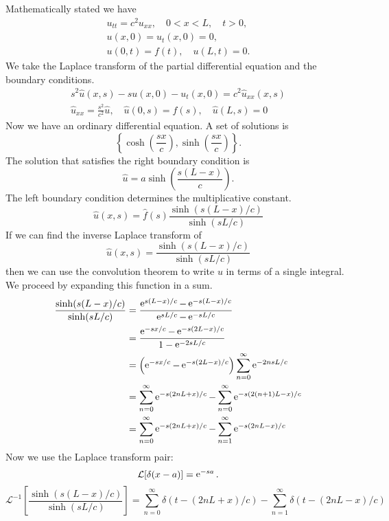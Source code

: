 {%
\begin{Solution}
  Mathematically stated we have
  \begin{gather*}
    u_{t t} = c^2 u_{x x}, \quad 0 < x < L, \quad t > 0, \\
    u(x,0) = u_t(x,0) = 0, \\
    u(0,t) = f(t), \quad u(L,t) = 0.
  \end{gather*}
  We take the Laplace transform of the partial differential equation and the
  boundary conditions.
  \begin{gather*}
    s^2 \hat{u}(x,s) - s u(x,0) - u_t(x,0) = c^2 \hat{u}_{x x}(x,s) \\
    \hat{u}_{x x} = \frac{s^2}{c^2} \hat{u}, \quad \hat{u}(0,s) = \hat{f}(s),
    \quad \hat{u}(L,s) = 0
  \end{gather*}
  Now we have an ordinary differential equation.  A set of solutions is
  \[
  \left\{ \cosh \left( \frac{s x}{c} \right), \sinh \left( \frac{s x}{c} \right)
  \right\}.
  \]
  The solution that satisfies the right boundary condition is
  \[
  \hat{u} = a \sinh \left( \frac{s (L-x)}{c} \right).
  \]
  The left boundary condition determines the multiplicative constant.
  \[
  \hat{u}(x,s) = \hat{f}(s) \frac{ \sinh(s(L-x)/c) }{ \sinh(s L/c) }
  \]
  If we can find the inverse Laplace transform of 
  \[
  \hat{u}(x,s) = \frac{ \sinh(s(L-x)/c) }{ \sinh(s L/c) }
  \]
  then we can use the convolution theorem to write $u$ in terms of a single 
  integral.  We proceed by expanding this function in a sum.
  \begin{align*}
    \frac{ \sinh(s(L-x)/c) }{ \sinh(s L/c) }
    &= \frac{ \mathop{\mathrm{e}}\nolimits^{s(L-x)/c} - \mathop{\mathrm{e}}\nolimits^{-s(L-x)/c} }
    { \mathop{\mathrm{e}}\nolimits^{s L/c} - \mathop{\mathrm{e}}\nolimits^{-s L/c} } \\
    &= \frac{ \mathop{\mathrm{e}}\nolimits^{-s x/c} - \mathop{\mathrm{e}}\nolimits^{-s (2L-x)/c} }{ 1 - \mathop{\mathrm{e}}\nolimits^{-2 s L/c} } \\
    &= \left( \mathop{\mathrm{e}}\nolimits^{-s x/c} - \mathop{\mathrm{e}}\nolimits^{-s(2L-x)/c} \right)
    \sum_{n = 0}^\infty \mathop{\mathrm{e}}\nolimits^{-2 n s L/c} \\
    &= \sum_{n = 0}^\infty \mathop{\mathrm{e}}\nolimits^{-s (2 n L + x)/c} 
    - \sum_{n = 0}^\infty \mathop{\mathrm{e}}\nolimits^{-s (2 (n+1) L - x)/c} \\
    &= \sum_{n = 0}^\infty \mathop{\mathrm{e}}\nolimits^{-s (2 n L + x)/c} 
    - \sum_{n = 1}^\infty \mathop{\mathrm{e}}\nolimits^{-s (2 n L - x)/c} 
  \end{align*}
  Now we use the Laplace transform pair:
  \[
  \mathcal{L}[\delta(x-a)] = \mathop{\mathrm{e}}\nolimits^{-s a}.
  \]
  \[
  \mathcal{L}^{-1} \left[ \frac{ \sinh(s(L-x)/c) }{ \sinh(s L/c) } \right]
  = \sum_{n = 0}^\infty \delta( t - (2 n L + x)/c)
  - \sum_{n = 1}^\infty \delta( t - (2 n L - x)/c)
\]
\end{Solution}}

